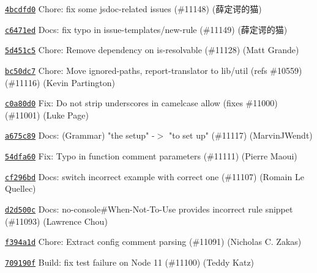 \begin{DoxyItemize}
\item \href{https://github.com/eslint/eslint/commit/4bcdfd07d514fd7a6b8672d33703d0b6c606f214}{\texttt{ {\ttfamily 4bcdfd0}}} Chore\+: fix some jsdoc-\/related issues (\#11148) (薛定谔的猫)
\item \href{https://github.com/eslint/eslint/commit/c6471ed6feb3e71e239379a7042deb9b8ab3cf39}{\texttt{ {\ttfamily c6471ed}}} Docs\+: fix typo in issue-\/templates/new-\/rule (\#11149) (薛定谔的猫)
\item \href{https://github.com/eslint/eslint/commit/5d451c510c15abc41b5bb14b4955a7db96aeb100}{\texttt{ {\ttfamily 5d451c5}}} Chore\+: Remove dependency on is-\/resolvable (\#11128) (Matt Grande)
\item \href{https://github.com/eslint/eslint/commit/bc50dc7737496712463220e662946eb516e36ae1}{\texttt{ {\ttfamily bc50dc7}}} Chore\+: Move ignored-\/paths, report-\/translator to lib/util (refs \#10559) (\#11116) (Kevin Partington)
\item \href{https://github.com/eslint/eslint/commit/c0a80d0ca3c80ca27694fc8aedcf84b72bfd9465}{\texttt{ {\ttfamily c0a80d0}}} Fix\+: Do not strip underscores in camelcase allow (fixes \#11000) (\#11001) (Luke Page)
\item \href{https://github.com/eslint/eslint/commit/a675c89573836adaf108a932696b061946abf1e6}{\texttt{ {\ttfamily a675c89}}} Docs\+: (Grammar) "{}the setup"{} -\/\texorpdfstring{$>$}{>} "{}to set up"{} (\#11117) (Marvin\+JWendt)
\item \href{https://github.com/eslint/eslint/commit/54dfa602f62e6d183d57d60d5fdd417a263f479e}{\texttt{ {\ttfamily 54dfa60}}} Fix\+: Typo in function comment parameters (\#11111) (Pierre Maoui)
\item \href{https://github.com/eslint/eslint/commit/cf296bdabf0dbbfbae491419e38aee4ecd63ec71}{\texttt{ {\ttfamily cf296bd}}} Docs\+: switch incorrect example with correct one (\#11107) (Romain Le Quellec)
\item \href{https://github.com/eslint/eslint/commit/d2d500ca5dff307189b9d4161a5e7b8282557dd6}{\texttt{ {\ttfamily d2d500c}}} Docs\+: no-\/console\#\+When-\/Not-\/\+To-\/\+Use provides incorrect rule snippet (\#11093) (Lawrence Chou)
\item \href{https://github.com/eslint/eslint/commit/f394a1dfc5eb4874f899b7bc19685896893af7b8}{\texttt{ {\ttfamily f394a1d}}} Chore\+: Extract config comment parsing (\#11091) (Nicholas C. Zakas)
\item \href{https://github.com/eslint/eslint/commit/709190f8c5d7559b1e0915e25af60b50a94ba1c7}{\texttt{ {\ttfamily 709190f}}} Build\+: fix test failure on Node 11 (\#11100) (Teddy Katz)

\end{DoxyItemize}
